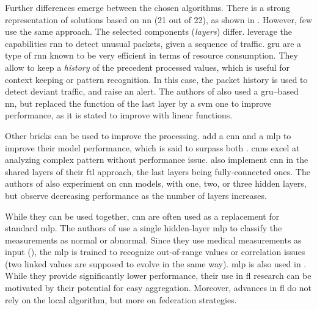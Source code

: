 Further differences emerge between the chosen algorithms.
There is a strong representation of solutions based on \gls{nn} (21 out of 22), as shown in .
However, few use the same approach.
The selected components (\emph{layers}) differ.
\textcite{nguyen_DIoTFederatedSelflearning_2019} leverage the capabilities \gls{rnn} to detect unusual packets, given a sequence of traffic.
\gls{gru} are a type of \gls{rnn} known to be very efficient in terms of resource consumption.
They allow to keep a \emph{history} of the precedent processed values, which is useful for context keeping or pattern recognition.
In this case, the packet history is used to detect deviant traffic, and raise an alert.
The authors of \cite{chen_Networkanomalydetection_2020b} also used a \gls{gru}--based \gls{nn}, but replaced the  function of the last layer by a \gls{svm} one to improve performance, as it is stated to improve with linear functions.

Other bricks can be used to improve the processing.
\textcite{li_DeepFedFederatedDeep_2020} add a \gls{cnn} and a \gls{mlp} to improve their model performance, which is said to surpass both \cite{nguyen_DIoTFederatedSelflearning_2019,schneble_Attackdetectionusing_2019}.
\Glspl{cnn} excel at analyzing complex pattern without performance issue.
\textcite{fan_IoTDefenderFederatedTransfer_2020} also implement \gls{cnn} in the shared layers of their \gls{ftl} approach, the last layers being fully-connected ones.
The authors of \cite{li_DeepFedFederatedDeep_2020b} also experiment on \gls{cnn} models, with one, two, or three hidden layers, but observe decreasing performance as the number of layers increases.

While they can be used together, \gls{cnn} are often used as a replacement for standard \gls{mlp}.
The authors of \cite{schneble_Attackdetectionusing_2019} use a single hidden-layer \gls{mlp} to classify the measurements as normal or abnormal.
Since they use medical measurements as input (), the \gls{mlp} is trained to recognize out-of-range values or correlation issues (two linked values are supposed to evolve in the same way).
\gls{mlp} is also used in \cite{rahman_InternetThingsIntrusion_2020,kim_CollaborativeAnomalyDetection_2020,hei_trustedfeatureaggregator_2020,liu_BlockchainFederatedLearning_2021}.
While they provide significantly lower performance, their use in \gls{fl} research can be motivated by their potential for easy aggregation.
Moreover, advances in \gls{fl} do not rely on the local algorithm, but more on federation strategies.


